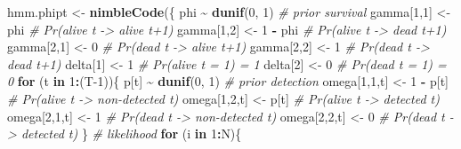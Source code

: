 \documentclass[
  12pt,
]{krantz}
\newenvironment{Shaded}{\begin{snugshade}}{\end{snugshade}}
\newcommand{\CommentTok}[1]{\textcolor[rgb]{0.56,0.35,0.01}{\textit{#1}}}
\newcommand{\ControlFlowTok}[1]{\textcolor[rgb]{0.13,0.29,0.53}{\textbf{#1}}}
\newcommand{\DecValTok}[1]{\textcolor[rgb]{0.00,0.00,0.81}{#1}}
\newcommand{\FunctionTok}[1]{\textcolor[rgb]{0.13,0.29,0.53}{\textbf{#1}}}
\newcommand{\NormalTok}[1]{#1}
\newcommand{\OtherTok}[1]{\textcolor[rgb]{0.56,0.35,0.01}{#1}}
\newcommand{\SpecialCharTok}[1]{\textcolor[rgb]{0.81,0.36,0.00}{\textbf{#1}}}
\begin{document}
\begin{Shaded}
\begin{Highlighting}[]
\NormalTok{hmm.phipt }\OtherTok{\textless{}{-}} \FunctionTok{nimbleCode}\NormalTok{(\{}
\NormalTok{  phi }\SpecialCharTok{\textasciitilde{}} \FunctionTok{dunif}\NormalTok{(}\DecValTok{0}\NormalTok{, }\DecValTok{1}\NormalTok{)      }\CommentTok{\# prior survival}
\NormalTok{  gamma[}\DecValTok{1}\NormalTok{,}\DecValTok{1}\NormalTok{] }\OtherTok{\textless{}{-}}\NormalTok{ phi      }\CommentTok{\# Pr(alive t {-}\textgreater{} alive t+1)}
\NormalTok{  gamma[}\DecValTok{1}\NormalTok{,}\DecValTok{2}\NormalTok{] }\OtherTok{\textless{}{-}} \DecValTok{1} \SpecialCharTok{{-}}\NormalTok{ phi  }\CommentTok{\# Pr(alive t {-}\textgreater{} dead t+1)}
\NormalTok{  gamma[}\DecValTok{2}\NormalTok{,}\DecValTok{1}\NormalTok{] }\OtherTok{\textless{}{-}} \DecValTok{0}        \CommentTok{\# Pr(dead t {-}\textgreater{} alive t+1)}
\NormalTok{  gamma[}\DecValTok{2}\NormalTok{,}\DecValTok{2}\NormalTok{] }\OtherTok{\textless{}{-}} \DecValTok{1}        \CommentTok{\# Pr(dead t {-}\textgreater{} dead t+1)}
\NormalTok{  delta[}\DecValTok{1}\NormalTok{] }\OtherTok{\textless{}{-}} \DecValTok{1}          \CommentTok{\# Pr(alive t = 1) = 1}
\NormalTok{  delta[}\DecValTok{2}\NormalTok{] }\OtherTok{\textless{}{-}} \DecValTok{0}          \CommentTok{\# Pr(dead t = 1) = 0}
  \ControlFlowTok{for}\NormalTok{ (t }\ControlFlowTok{in} \DecValTok{1}\SpecialCharTok{:}\NormalTok{(T}\DecValTok{{-}1}\NormalTok{))\{}
\NormalTok{    p[t] }\SpecialCharTok{\textasciitilde{}} \FunctionTok{dunif}\NormalTok{(}\DecValTok{0}\NormalTok{, }\DecValTok{1}\NormalTok{)       }\CommentTok{\# prior detection}
\NormalTok{    omega[}\DecValTok{1}\NormalTok{,}\DecValTok{1}\NormalTok{,t] }\OtherTok{\textless{}{-}} \DecValTok{1} \SpecialCharTok{{-}}\NormalTok{ p[t] }\CommentTok{\# Pr(alive t {-}\textgreater{} non{-}detected t)}
\NormalTok{    omega[}\DecValTok{1}\NormalTok{,}\DecValTok{2}\NormalTok{,t] }\OtherTok{\textless{}{-}}\NormalTok{ p[t]     }\CommentTok{\# Pr(alive t {-}\textgreater{} detected t)}
\NormalTok{    omega[}\DecValTok{2}\NormalTok{,}\DecValTok{1}\NormalTok{,t] }\OtherTok{\textless{}{-}} \DecValTok{1}        \CommentTok{\# Pr(dead t {-}\textgreater{} non{-}detected t)}
\NormalTok{    omega[}\DecValTok{2}\NormalTok{,}\DecValTok{2}\NormalTok{,t] }\OtherTok{\textless{}{-}} \DecValTok{0}        \CommentTok{\# Pr(dead t {-}\textgreater{} detected t)}
\NormalTok{  \}}
  \CommentTok{\# likelihood}
  \ControlFlowTok{for}\NormalTok{ (i }\ControlFlowTok{in} \DecValTok{1}\SpecialCharTok{:}\NormalTok{N)\{}

\end{Highlighting}
\end{Shaded}
\end{document}
